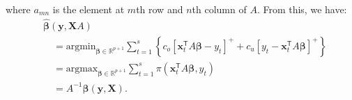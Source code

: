 \documentclass{article}
\begin{document}
    where $a_{mn}$ is the element at $m$th row and $n$th column of $A$.
    From this, we have:
    \[
        \begin{aligned}
            &\hat{\boldsymbol{\beta}}(\mathbf{y},\mathbf{X}A)\\
            &\quad=\text{argmin}_{\boldsymbol{\beta}\in \mathbb{R}^{p+1}}\displaystyle\sum_{t=1}^s{\left\{c_o\left[\mathbf{x}_t^{\mathsf{T}}A\boldsymbol{\beta}-y_t\right]^{+}+c_u\left[y_t-\mathbf{x}_t^{\mathsf{T}}A\boldsymbol{\beta}\right]^{+}\right\}}\\
            &\quad=\text{argmax}_{\boldsymbol{\beta}\in \mathbb{R}^{p+1}}\displaystyle\sum_{t=1}^s{\pi(\mathbf{x}_t^{\mathsf{T}}A\boldsymbol{\beta},y_t)}\\
            &\quad=A^{-1}\hat{\boldsymbol{\beta}}(\mathbf{y},\mathbf{X}).
        \end{aligned}
    \]
    
\end{document}
